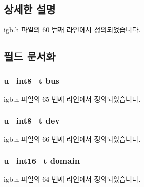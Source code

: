 \subsection{상세한 설명}


igb.\+h 파일의 60 번째 라인에서 정의되었습니다.



\subsection{필드 문서화}
\subsubsection[{\texorpdfstring{bus}{bus}}]{\setlength{\rightskip}{0pt plus 5cm}u\+\_\+int8\+\_\+t bus}\hypertarget{struct__device__t_a844e4a2d44ca994486697edd16c389a4}{}\label{struct__device__t_a844e4a2d44ca994486697edd16c389a4}


igb.\+h 파일의 65 번째 라인에서 정의되었습니다.

\subsubsection[{\texorpdfstring{dev}{dev}}]{\setlength{\rightskip}{0pt plus 5cm}u\+\_\+int8\+\_\+t dev}\hypertarget{struct__device__t_ac1d9fe5dde44191d33a738f2c7c30538}{}\label{struct__device__t_ac1d9fe5dde44191d33a738f2c7c30538}


igb.\+h 파일의 66 번째 라인에서 정의되었습니다.

\subsubsection[{\texorpdfstring{domain}{domain}}]{\setlength{\rightskip}{0pt plus 5cm}u\+\_\+int16\+\_\+t domain}\hypertarget{struct__device__t_a6ba724378c23b9f5636bbbe97d36d24c}{}\label{struct__device__t_a6ba724378c23b9f5636bbbe97d36d24c}


igb.\+h 파일의 64 번째 라인에서 정의되었습니다.

